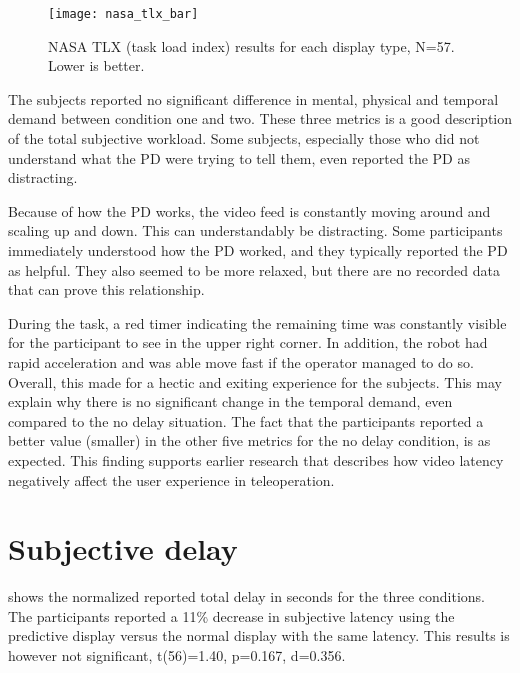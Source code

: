 \begin{figure}[h!]
    \centering
    \texttt{[image: nasa\_tlx\_bar]}
    \vspace{-2mm}
    \caption{NASA TLX (task load index) results for each display type, N=57. Lower is better.}
    \vspace{-3mm}
    \label{tlx}
\end{figure}

The subjects reported no significant difference in mental, physical and temporal demand between condition one and two. These three metrics is a good description of the total subjective workload. Some subjects, especially those who did not understand what the PD were trying to tell them, even reported the PD as distracting.

\restoregeometry

Because of how the PD works, the video feed is constantly moving around and scaling up and down. This can understandably be distracting. Some participants immediately understood how the PD worked, and they typically reported the PD as helpful. They also seemed to be more relaxed, but there are no recorded data that can prove this relationship.



During the task, a red timer indicating the remaining time was constantly visible for the participant to see in the upper right corner. In addition, the robot had rapid acceleration and was able move fast if the operator managed to do so. Overall, this made for a hectic and exiting experience for the subjects. This may explain why there is no significant change in the temporal demand, even compared to the no delay situation. The fact that the participants reported a better value (smaller) in the other five metrics for the no delay condition, is as expected. This finding supports earlier research that describes how video latency negatively affect the user experience in teleoperation.

\clearpage
\section{Subjective delay}

 shows the normalized reported total delay in seconds for the three conditions. The participants reported a 11\% decrease in subjective latency using the predictive display versus the normal display with the same latency. This results is however not significant, t(56)=1.40, p=0.167, d=0.356.

